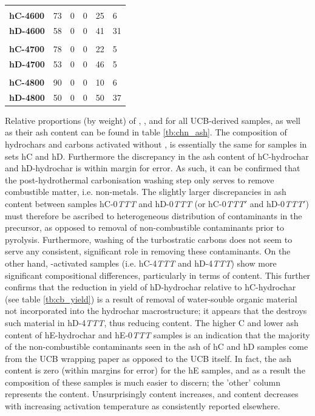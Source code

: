 \begin{table}[t!]
\begin{tabularx}{\textwidth}{lXXXX|X}
        &&&&&\\
        \textbf{hC-4600} & 73 & 0 & 0 & 25 & 6 \\
        \textbf{hD-4600} & 58 & 0 & 0 & 41 & 31 \\
        &&&&&\\
        \textbf{hC-4700} & 78 & 0 & 0 & 22 & 5 \\
        \textbf{hD-4700} & 53 & 0 & 0 & 46 & 5 \\
        &&&&&\\
        \textbf{hC-4800} & 90 & 0 & 0 & 10 & 6 \\
        \textbf{hD-4800} & 50 & 0 & 0 & 50 & 37 \\
    \bottomrule
    \end{tabularx}
\end{table}

Relative proportions (by weight) of , , and  for all UCB-derived samples, as well as their ash content can be found in table \ref{tb:chn_ash}. The composition of hydrochars and carbons activated without , is essentially the same for samples in sets hC and hD. Furthermore the discrepancy in the ash content of hC-hydrochar and hD-hydrochar is within margin for error. As such, it can be confirmed that the post-hydrothermal carbonisation washing step only serves to remove combustible matter, i.e. non-metals. The slightly larger discrepancies in ash content between samples hC-0\textit{TTT} and hD-0\textit{TTT} (or hC-0\textit{TTT}$'$ and hD-0\textit{TTT}$'$) must therefore be ascribed to heterogeneous distribution of contaminants in the precursor, as opposed to removal of non-combustible contaminants prior to pyrolysis. Furthermore, washing of the turbostratic carbons does not seem to serve any consistent, significant role  in removing these contaminants. On the other hand, -activated samples (i.e. hC-4\textit{TTT} and hD-4\textit{TTT}) show more significant compositional differences, particularly in terms of  content. This further confirms that the reduction in yield of hD-hydrochar relative to hC-hydrochar (see table \ref{tb:cb_yield}) is a result of removal of water-souble organic material not incorporated into the hydrochar macrostructure; it appears that the  destroys such material in hD-4\textit{TTT}, thus reducing  content. The higher C and lower ash content of hE-hydrochar and hE-0\textit{TTT} samples is an indication that the majority of the non-combustible contaminants seen in the ash of hC and hD samples come from the UCB wrapping paper as opposed to the UCB itself. In fact, the ash content is zero (within margins for error) for the hE samples, and as a result the composition of these samples is much easier to discern; the 'other' column represents the  content. Unsurprisingly  content increases, and  content decreases with increasing activation temperature as consistently reported elsewhere.\citep{Blankenship2022Modulating, Sevilla2014Energy}


